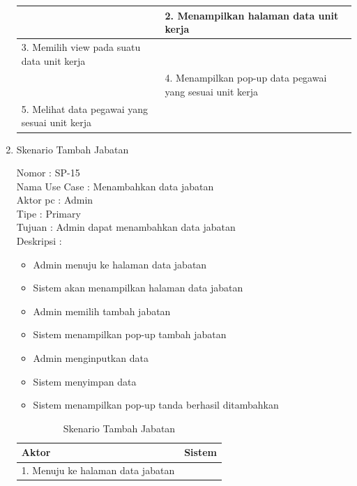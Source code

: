 \begin{enumerate}
\begin{table}
\begin{tabular}{ | p{63mm} | p{65mm} |}
		\hline
		
		&  2. Menampilkan halaman data unit kerja \\
		
		\hline
		
		3. Memilih view pada suatu data unit kerja & \\
		
		\hline
		
		& 4. Menampilkan pop-up data pegawai yang sesuai unit kerja \\
		\hline
		
		5. Melihat data pegawai yang sesuai unit kerja & \\
		
		\hline
		
		
	\end{tabular}
\end{table}

\item Skenario Tambah Jabatan

Nomor \kern 3.6pc : SP-15 \\
Nama Use Case : Menambahkan data jabatan \\
Aktor  pc : Admin \\
Tipe \kern 4.6pc : Primary \\
Tujuan \kern 3.6pc : Admin dapat menambahkan data jabatan \\
Deskripsi \kern 2.5pc : 

\begin{itemize}
	\item Admin menuju ke halaman data jabatan
	\item Sistem akan menampilkan halaman data jabatan
	\item Admin memilih tambah jabatan
	\item Sistem menampilkan pop-up tambah jabatan
	\item Admin menginputkan data
	\item Sistem menyimpan data
	\item Sistem menampilkan pop-up tanda berhasil ditambahkan
	
\end{itemize}

\begin{table}
	\caption{Skenario Tambah Jabatan}
	\centering
	\begin{tabular}{ | l | p{68.5mm} |}
		\hline 
		\textbf{Aktor} & \textbf{Sistem} \\
		\hline
		
		1.	Menuju ke halaman data jabatan &  \\
		

\end{tabular}
\end{table}
\end{enumerate}
